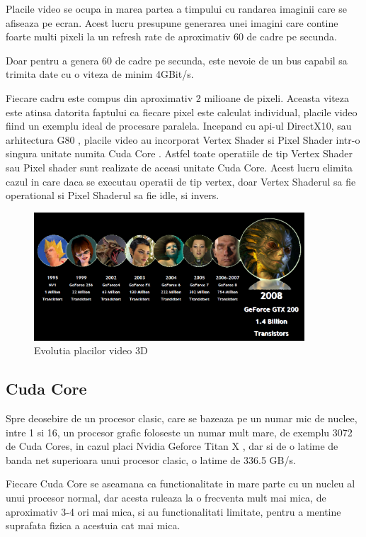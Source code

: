 Placile video se ocupa in marea partea a timpului cu randarea imaginii care se afiseaza pe ecran.
Acest lucru presupune generarea unei imagini care contine foarte multi pixeli la un refresh rate de
aproximativ 60 de cadre pe secunda. 

Doar pentru a genera 60 de cadre pe secunda, este nevoie de un bus capabil sa trimita date cu o
viteza de minim 4GBit/s.

Fiecare cadru este compus din aproximativ 2 milioane de pixeli. Aceasta viteza este atinsa datorita
faptului ca fiecare pixel este calculat individual, placile video fiind un exemplu ideal de
procesare paralela. Incepand cu api-ul DirectX10, sau arhitectura G80 , placile video au incorporat Vertex Shader si
Pixel Shader intr-o singura unitate numita Cuda Core \cite{luebke2008gpu}. Astfel toate operatiile
de tip Vertex Shader sau Pixel shader sunt realizate de aceasi unitate Cuda Core. Acest lucru
elimita cazul in care  daca se executau operatii de tip vertex, doar Vertex Shaderul sa fie
operational si Pixel Shaderul sa fie idle, si invers.

\begin{figure}[ht] \centering
\includegraphics[width=0.9\textwidth]{img/evolution.png}
\caption{Evolutia placilor video 3D} \end{figure}

\subsection{Cuda Core}

Spre deosebire de un procesor clasic, care se bazeaza pe un numar mic de nuclee, intre 1 si 16, un
procesor grafic foloseste un numar mult mare, de exemplu 3072 de Cuda Cores, in cazul placi Nvidia Geforce
Titan X \cite{titanx}, dar si de o latime de banda net superioara unui procesor clasic, o latime de 336.5 GB/s.

Fiecare Cuda Core se aseamana ca functionalitate in mare parte cu un nucleu al unui procesor
normal, dar acesta ruleaza la o frecventa mult mai mica, de aproximativ 3-4 ori mai mica, si au
functionalitati limitate, pentru a mentine suprafata fizica a acestuia cat mai mica.

